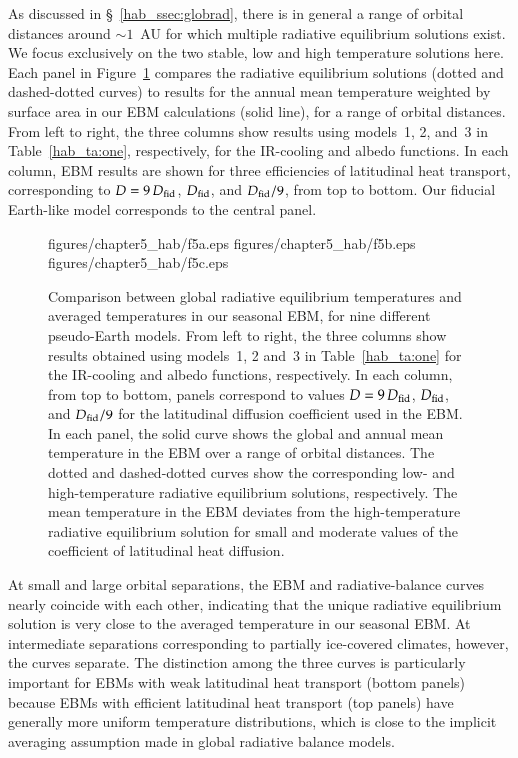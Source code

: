 As discussed in \S~\ref{hab_ssec:globrad}, there is in general a range
of orbital distances around $\sim 1$~AU for which multiple radiative
equilibrium solutions exist.  We focus exclusively on the two stable,
low and high temperature solutions here. Each panel in
Figure~\ref{hab_fig:temp} compares the radiative equilibrium solutions
(dotted and dashed-dotted curves) to results for the annual mean
temperature weighted by surface area in our EBM calculations (solid
line), for a range of orbital distances.  From left to right, the
three columns show results using models~1, 2, and~3 in
Table~\ref{hab_ta:one}, respectively, for the IR-cooling and albedo
functions. In each column, EBM results are shown for three
efficiencies of latitudinal heat transport, corresponding to
$D=9\,D_{\rm fid}$, $D_{\rm fid}$, and $D_{\rm fid}/9$, from top to
bottom. Our fiducial Earth-like model corresponds to the central
panel.
\begin{figure}[p]
\plotthree
{figures/chapter5_hab/f5a.eps}
{figures/chapter5_hab/f5b.eps}
{figures/chapter5_hab/f5c.eps}
\caption[Comparison between global radiative equilibrium temperatures
and average temperatures in the $t$-dependent EBM, for nine
pseudo-Earth models.]{Comparison between global radiative equilibrium
temperatures and averaged temperatures in our seasonal EBM, for nine
different pseudo-Earth models. From left to right, the three columns
show results obtained using models~1, 2 and~3 in
Table~\ref{hab_ta:one} for the IR-cooling and albedo functions,
respectively. In each column, from top to bottom, panels correspond to
values $D=9\,D_{\rm fid}$, $D_{\rm fid}$, and $D_{\rm fid}/9$ for the
latitudinal diffusion coefficient used in the EBM.  In each panel, the
solid curve shows the global and annual mean temperature in the EBM
over a range of orbital distances. The dotted and dashed-dotted curves
show the corresponding low- and high-temperature radiative equilibrium
solutions, respectively.  The mean temperature in the EBM deviates
from the high-temperature radiative equilibrium solution for small and
moderate values of the coefficient of latitudinal heat diffusion.}
\label{hab_fig:temp}
\end{figure}
\afterpage{\clearpage}

At small and large orbital separations, the EBM and radiative-balance
curves nearly coincide with each other, indicating that the unique
radiative equilibrium solution is very close to the averaged
temperature in our seasonal EBM. At intermediate separations
corresponding to partially ice-covered climates, however, the curves
separate. The distinction among the three curves is particularly
important for EBMs with weak latitudinal heat transport (bottom
panels) because EBMs with efficient latitudinal heat transport (top
panels) have generally more uniform temperature distributions, which
is close to the implicit averaging assumption made in global radiative
balance models.

